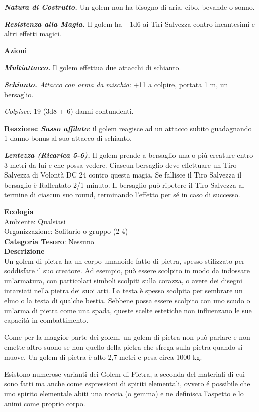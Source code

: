 \begin{multicols}{2}
{\emph{\textbf{Natura di Costrutto.}} Un golem non ha bisogno di aria, cibo, bevande o sonno.

\emph{\textbf{Resistenza alla Magia.}} Il golem ha +1d6 ai Tiri Salvezza contro incantesimi e altri effetti magici.

\textbf{Azioni}

\emph{\textbf{Multiattacco.}} Il golem effettua due attacchi di schianto.

\emph{\textbf{Schianto.} Attacco con arma da mischia}: +11 a colpire, portata 1 m, un bersaglio.

\emph{Colpisce:} 19 (3d8 + 6) danni contundenti.

\textbf{Reazione: \emph{Sasso affilato}}: il golem reagisce ad un attacco subito guadagnando 1 danno bonus al suo attacco di schianto.

\emph{\textbf{Lentezza (Ricarica 5-6).}} Il golem prende a bersaglio una o più creature entro 3 metri da lui e che possa vedere. Ciascun bersaglio deve effettuare un Tiro Salvezza di Volontà DC 24 contro questa magia. Se fallisce il Tiro Salvezza il bersaglio è Rallentato 2/1 minuto. Il bersaglio può ripetere il Tiro Salvezza al termine di ciascun suo round, terminando l'effetto per sé in caso di successo.

\textbf{Ecologia}\\
Ambiente: Qualsiasi\\
Organizzazione: Solitario o gruppo (2-4)\\
\textbf{Categoria Tesoro}: Nessuno\\
\textbf{Descrizione}\\
Un golem di pietra ha un corpo umanoide fatto di pietra, spesso stilizzato per soddisfare il suo creatore. Ad esempio, può essere scolpito in modo da indossare un'armatura, con particolari simboli scolpiti sulla corazza, o avere dei disegni intarsiati nella pietra dei suoi arti. La testa è spesso scolpita per sembrare un elmo o la testa di qualche bestia. Sebbene possa essere scolpito con uno scudo o un'arma di pietra come una spada, queste scelte estetiche non influenzano le sue capacità in combattimento.

Come per la maggior parte dei golem, un golem di pietra non può parlare e non emette altro suono se non quello della pietra che sfrega sulla pietra quando si muove. Un golem di pietra è alto 2,7 metri e pesa circa 1000 kg.

Esistono numerose varianti dei Golem di Pietra, a seconda del materiali di cui sono fatti ma anche come espressioni di spiriti elementali, ovvero é possibile che uno spirito elementale abiti una roccia (o gemma) e ne definisca l'aspetto e lo animi come proprio corpo.

}
\end{multicols}
